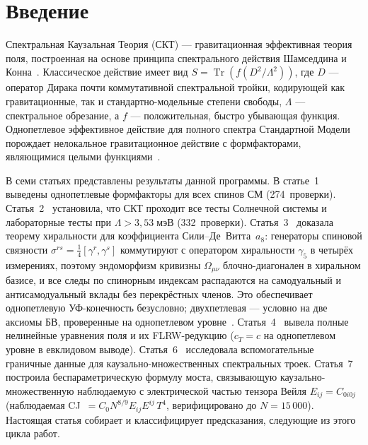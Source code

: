 \documentclass[12pt,a4paper]{article}
\theoremstyle{plain}
\theoremstyle{definition}
\theoremstyle{remark}
\newcommand{\Tr}{\operatorname{Tr}}
\newcommand{\Esq}{E_{ij}E^{ij}}
\begin{document}
\tableofcontents
\newpage

\section{Введение}
\label{sec:intro}

Спектральная Каузальная Теория (СКТ) --- гравитационная эффективная
теория поля, построенная на основе принципа спектрального действия
Шамседдина и Конна~\cite{CC:1996,CC:1997}. Классическое действие
имеет вид $S = \Tr(f(D^2/\Lambda^2))$, где $D$ --- оператор Дирака
почти коммутативной спектральной тройки, кодирующей как гравитационные,
так и стандартно-модельные степени свободы, $\Lambda$ --- спектральное
обрезание, а $f$ --- положительная, быстро убывающая функция.
Однопетлевое эффективное действие для полного спектра Стандартной
Модели порождает нелокальное гравитационное действие с формфакторами,
являющимися целыми функциями~\cite{Alfyorov:2026paper1}.

В семи статьях представлены результаты данной программы. В
статье~1~\cite{Alfyorov:2026paper1} выведены однопетлевые формфакторы
для всех спинов СМ (274~проверки).
Статья~2~\cite{Alfyorov:2026paper2} установила, что СКТ проходит все
тесты Солнечной системы и лабораторные тесты при
$\Lambda > 3{,}53\;\text{мэВ}$ (332~проверки).
Статья~3~\cite{Alfyorov:2026paper3} доказала теорему хиральности
для коэффициента Сили--Де~Витта~$a_8$: генераторы спиновой связности
$\sigma^{rs} = \frac{1}{4}[\gamma^r, \gamma^s]$ коммутируют с
оператором хиральности $\gamma_5$ в четырёх измерениях, поэтому
эндоморфизм кривизны $\Omega_{\mu\nu}$ блочно-диагонален в
хиральном базисе, и все следы по спинорным индексам распадаются
на самодуальный и антисамодуальный вклады без перекрёстных
членов. Это обеспечивает однопетлевую УФ-конечность безусловно;
двухпетлевая --- условно на две аксиомы БВ, проверенные
на однопетлевом уровне~\cite{Alfyorov:2026paper3}.
Статья~4~\cite{Alfyorov:2026paper4} вывела полные нелинейные
уравнения поля и их FLRW-редукцию ($c_T = c$ на однопетлевом
уровне в евклидовом выводе).
Статья~6~\cite{Alfyorov:2026paper6} исследовала вспомогательные
граничные данные для каузально-множественных спектральных троек.
Статья~7~\cite{Alfyorov:2026paper7} построила беспараметрическую
формулу моста, связывающую каузально-множественную наблюдаемую с
электрической частью тензора Вейля $E_{ij} = C_{0i0j}$
(наблюдаемая CJ~$= C_0 N^{8/9} \Esq\, T^4$,
верифицировано до $N = 15\,000$).
Настоящая статья собирает и классифицирует предсказания, следующие
из этого цикла работ.
\end{document}
